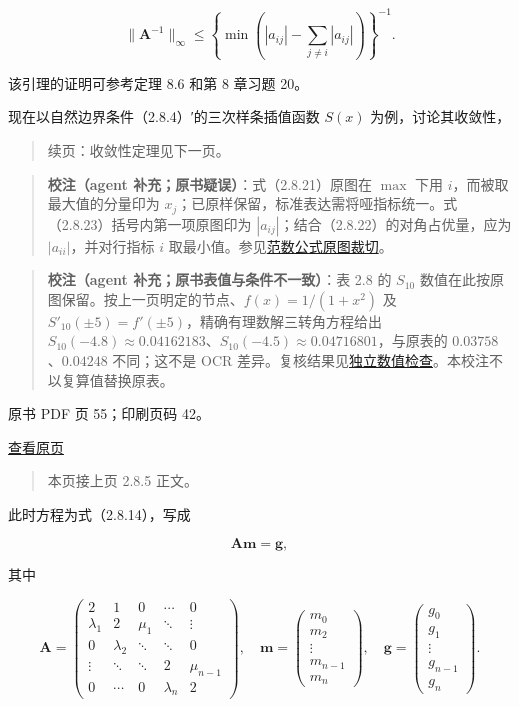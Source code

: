 \[\|\boldsymbol A^{-1}\|_\infty\leqslant\left\{\min\left(|a_{ij}|-\sum_{j\ne i}|a_{ij}|\right)\right\}^{-1}.\tag{2.8.23}\]

该引理的证明可参考定理 8.6 和第 8 章习题 20。

现在以自然边界条件（2.8.4）′的三次样条插值函数 \(S(x)\) 为例，讨论其收敛性，

\begin{quote}
续页：收敛性定理见下一页。
\end{quote}

\begin{quote}
\textbf{校注（agent 补充；原书疑误）}：式（2.8.21）原图在 \(\max\) 下用 \(i\)，而被取最大值的分量印为 \(x_j\)；已原样保留，标准表达需将哑指标统一。式（2.8.23）括号内第一项原图印为 \(|a_{ij}|\)；结合（2.8.22）的对角占优量，应为 \(|a_{ii}|\)，并对行指标 \(i\) 取最小值。参见\href{verified/assets/ch02b/pdf-054-norm-detail.png}{范数公式原图裁切}。
\end{quote}

\begin{quote}
\textbf{校注（agent 补充；原书表值与条件不一致）}：表 2.8 的 \(S_{10}\) 数值在此按原图保留。按上一页明定的节点、\(f(x)=1/(1+x^2)\) 及 \(S'_{10}(\pm5)=f'(\pm5)\)，精确有理数解三转角方程给出 \(S_{10}(-4.8)\approx0.04162183\)、\(S_{10}(-4.5)\approx0.04716801\)，与原表的 \(0.03758\)、\(0.04248\) 不同；这不是 OCR 差异。复核结果见\href{staging/ch02b/table-2-8-check.txt}{独立数值检查}。本校注不以复算值替换原表。
\end{quote}

\clearpage

原书 PDF 页 55；印刷页码 42。

\href{source-images/pdf-055.jpeg}{查看原页}

\begin{quote}
本页接上页 2.8.5 正文。
\end{quote}

此时方程为式（2.8.14），写成

\[\boldsymbol A\boldsymbol m=\boldsymbol g,\tag{2.8.24}\]

其中

\[\boldsymbol A=\begin{pmatrix}
2&1&0&\cdots&0\\
\lambda_1&2&\mu_1&\ddots&\vdots\\
0&\lambda_2&\ddots&\ddots&0\\
\vdots&\ddots&\ddots&2&\mu_{n-1}\\
0&\cdots&0&\lambda_n&2
\end{pmatrix},\quad
\boldsymbol m=\begin{pmatrix}m_0\\m_2\\\vdots\\m_{n-1}\\m_n\end{pmatrix},\quad
\boldsymbol g=\begin{pmatrix}g_0\\g_1\\\vdots\\g_{n-1}\\g_n\end{pmatrix}.\]

